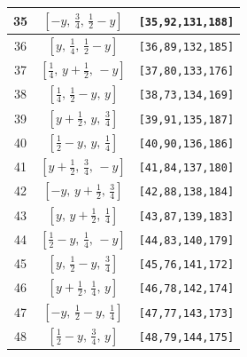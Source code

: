 \documentclass[fleqn,8pt]{jsarticle}
\begin{document}
\begin{longtable}{ccc}
35 & $\left[ - y,\, \frac{3}{4},\, \frac{1}{2} - y \right]$ & {\tt [35,92,131,188]} \\ \hline
36 & $\left[ y,\, \frac{1}{4},\, \frac{1}{2} - y \right]$ & {\tt [36,89,132,185]} \\ \hline
37 & $\left[ \frac{1}{4},\, y + \frac{1}{2},\, - y \right]$ & {\tt [37,80,133,176]} \\ \hline
38 & $\left[ \frac{1}{4},\, \frac{1}{2} - y,\, y \right]$ & {\tt [38,73,134,169]} \\ \hline
39 & $\left[ y + \frac{1}{2},\, y,\, \frac{3}{4} \right]$ & {\tt [39,91,135,187]} \\ \hline
40 & $\left[ \frac{1}{2} - y,\, y,\, \frac{1}{4} \right]$ & {\tt [40,90,136,186]} \\ \hline
41 & $\left[ y + \frac{1}{2},\, \frac{3}{4},\, - y \right]$ & {\tt [41,84,137,180]} \\ \hline
42 & $\left[ - y,\, y + \frac{1}{2},\, \frac{3}{4} \right]$ & {\tt [42,88,138,184]} \\ \hline
43 & $\left[ y,\, y + \frac{1}{2},\, \frac{1}{4} \right]$ & {\tt [43,87,139,183]} \\ \hline
44 & $\left[ \frac{1}{2} - y,\, \frac{1}{4},\, - y \right]$ & {\tt [44,83,140,179]} \\ \hline
45 & $\left[ y,\, \frac{1}{2} - y,\, \frac{3}{4} \right]$ & {\tt [45,76,141,172]} \\ \hline
46 & $\left[ y + \frac{1}{2},\, \frac{1}{4},\, y \right]$ & {\tt [46,78,142,174]} \\ \hline
47 & $\left[ - y,\, \frac{1}{2} - y,\, \frac{1}{4} \right]$ & {\tt [47,77,143,173]} \\ \hline
48 & $\left[ \frac{1}{2} - y,\, \frac{3}{4},\, y \right]$ & {\tt [48,79,144,175]} \\
\end{longtable}
\renewcommand{\arraystretch}{1.2}
\end{document}
